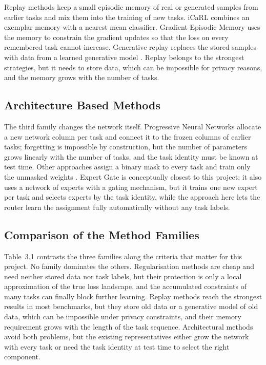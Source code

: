 Replay methods keep a small episodic memory of real or generated samples
from earlier tasks and mix them into the training of new tasks. iCaRL
\cite{rebuffi2017} combines an exemplar memory with a nearest mean
classifier. Gradient Episodic Memory \cite{lopezpaz2017} uses the memory to
constrain the gradient updates so that the loss on every remembered task
cannot increase. Generative replay replaces the stored samples with data
from a learned generative model \cite{shin2017}. Replay belongs to the
strongest strategies, but it needs to store data, which can be impossible
for privacy reasons, and the memory grows with the number of tasks.

\subsection{Architecture Based Methods}

The third family changes the network itself. Progressive Neural Networks
\cite{rusu2016} allocate a new network column per task and connect it to
the frozen columns of earlier tasks; forgetting is impossible by
construction, but the number of parameters grows linearly with the number
of tasks, and the task identity must be known at test time. Other
approaches assign a binary mask to every task and train only the unmasked
weights \cite{mallya2018}. Expert Gate \cite{aljundi2017} is conceptually
closest to this project: it also uses a network of experts with a gating
mechanism, but it trains one new expert per task and selects experts by the
task identity, while the approach here lets the router learn the assignment
fully automatically without any task labels.

\subsection{Comparison of the Method Families}

Table~3.1 contrasts the three families along the criteria that matter for
this project. No family dominates the others. Regularisation methods are
cheap and need neither stored data nor task labels, but their protection is
only a local approximation of the true loss landscape, and the accumulated
constraints of many tasks can finally block further learning. Replay
methods reach the strongest results in most benchmarks, but they store old
data or a generative model of old data, which can be impossible under
privacy constraints, and their memory requirement grows with the length of
the task sequence. Architectural methods avoid both problems, but the
existing representatives either grow the network with every task or need
the task identity at test time to select the right component.

